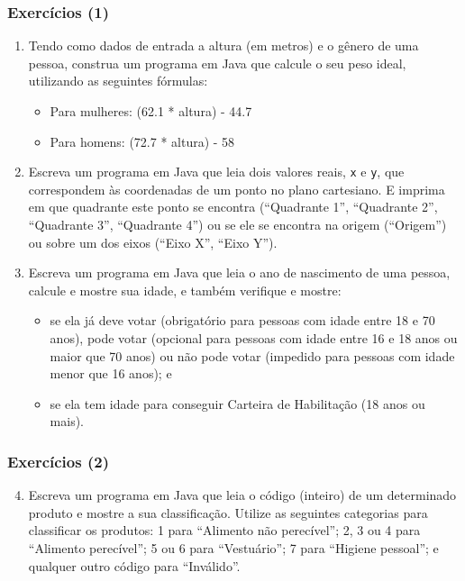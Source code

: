 \documentclass[xcolor={dvipsnames,table},aspectratio=169]{beamer}
\begin{document}
\begin{frame}\frametitle{Exercícios (1)}
\begin{enumerate}
	\item Tendo como dados de entrada a altura (em metros) e o gênero de uma pessoa, construa um programa em Java que calcule o seu peso ideal, utilizando as seguintes fórmulas:
	\begin{itemize}
		\item Para mulheres: (62.1 * altura) - 44.7
		\item Para homens: (72.7 * altura) - 58
	\end{itemize}
	\item Escreva um programa em Java que leia dois valores reais, \texttt{x} e \texttt{y}, que correspondem às coordenadas de um ponto no plano cartesiano. E imprima em que quadrante este ponto se encontra (``Quadrante 1'', ``Quadrante 2'', ``Quadrante 3'', ``Quadrante 4'') ou se ele se encontra na origem (``Origem'') ou sobre um dos eixos (``Eixo X'', ``Eixo Y'').\\
	\item Escreva um programa em Java que leia o ano de nascimento de uma pessoa, calcule e mostre sua idade, e também verifique e mostre:
	\begin{itemize}
		\item se ela já deve votar (obrigatório para pessoas com idade entre 18 e 70 anos), pode votar (opcional para pessoas com idade entre 16 e 18 anos ou maior que 70 anos) ou não pode votar (impedido para pessoas com idade menor que 16 anos); e
		\item se ela tem idade para conseguir Carteira de Habilitação (18 anos ou mais).
	\end{itemize}
\end{enumerate}
\end{frame}

\begin{frame}\frametitle{Exercícios (2)}
\begin{enumerate}
	\setcounter{enumi}{3}
	\item Escreva um programa em Java que leia o código (inteiro) de um determinado produto e mostre a sua classificação. Utilize as seguintes categorias para classificar os produtos: 1 para ``Alimento não perecível''; 2, 3 ou 4 para ``Alimento perecível''; 5 ou 6 para ``Vestuário''; 7 para ``Higiene pessoal''; e qualquer outro código para ``Inválido''.
\end{enumerate}
\end{frame}
\end{document}
